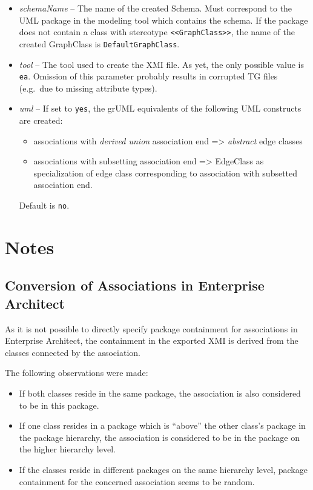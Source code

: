\documentclass[a4paper]{article}
\begin{document}
\begin{itemize}
		\item \emph{schemaName} -- The name of the created Schema. Must correspond to the UML package in the modeling tool which contains the schema. If the package does not contain a class with stereotype \texttt{<<GraphClass>>}, the name of the created GraphClass is \texttt{DefaultGraphClass}.
		\item \emph{tool} -- The tool used to create the XMI file. As yet, the only possible value is \texttt{ea}. Omission of this parameter probably results in corrupted TG files (e.g.\ due to missing attribute types).
		\item \emph{uml} -- If set to \texttt{yes}, the grUML equivalents of the following UML constructs are created:
		\begin{itemize}
			\item associations with \emph{derived union} association end => \emph{abstract} edge classes
			\item associations with subsetting association end => EdgeClass as specialization of edge class corresponding to association with subsetted association end.
		\end{itemize}
		Default is \texttt{no}.
	\end{itemize}
	
	\section{Notes}
	\subsection{Conversion of Associations in Enterprise Architect}
	As it is not possible to directly specify package containment for associations in Enterprise Architect, the containment in the exported XMI is derived from the classes connected by the association.

	The following observations were made:
	\begin{itemize}
		\item If both classes reside in the same package, the association is also considered to be in this package.
		\item If one class resides in a package which is ``above'' the other class's package in the package hierarchy, the association is considered to be in the package on the higher hierarchy level.
		\item If the classes reside in different packages on the same hierarchy level, package containment for the concerned association seems to be random.
	\end{itemize}
	
\end{document}
